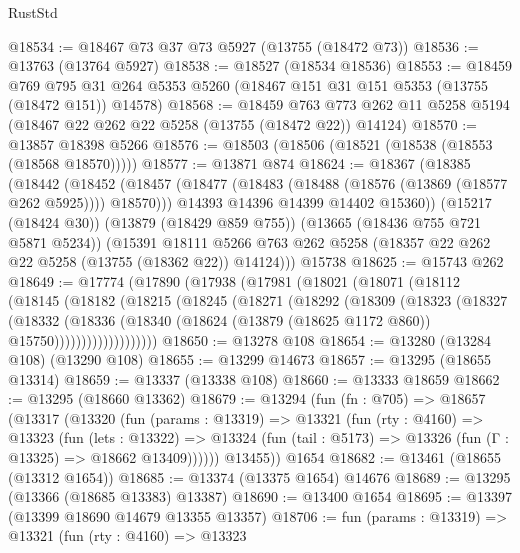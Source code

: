 \begin{lexlean}{RustStd}
\begin{coremodule}
@18534 := @18467 @73 @37 @73 @5927 (@13755 (@18472 @73))
@18536 := @13763 (@13764 @5927)
@18538 := @18527 (@18534 @18536)
@18553 := @18459
    @769
    @795
    @31
    @264
    @5353
    @5260
    (@18467 @151 @31 @151 @5353 (@13755 (@18472 @151)) @14578)
@18568 := @18459
    @763
    @773
    @262
    @11
    @5258
    @5194
    (@18467 @22 @262 @22 @5258 (@13755 (@18472 @22)) @14124)
@18570 := @13857 @18398 @5266
@18576 := @18503 (@18506 (@18521 (@18538 (@18553 (@18568 @18570)))))
@18577 := @13871 @874
@18624 := @18367
    (@18385
      (@18442
        (@18452
          (@18457 (@18477 (@18483 (@18488 (@18576 (@13869 (@18577 @262 @5925)))) @18570)))
          @14393
          @14396
          @14399
          @14402
          @15360))
      (@15217 (@18424 @30))
      (@13879 (@18429 @859 @755))
      (@13665 (@18436 @755 @721 @5871 @5234))
      (@15391
        @18111
        @5266
        @763
        @262
        @5258
        (@18357 @22 @262 @22 @5258 (@13755 (@18362 @22)) @14124)))
    @15738
@18625 := @15743 @262
@18649 := @17774
    (@17890
      (@17938
        (@17981
          (@18021
            (@18071
              (@18112
                (@18145
                  (@18182
                    (@18215
                      (@18245
                        (@18271
                          (@18292
                            (@18309
                              (@18323
                                (@18327
                                  (@18332
                                    (@18336
                                      (@18340
                                        (@18624
                                          (@13879 (@18625 @1172 @860))
                                          @15750)))))))))))))))))))
@18650 := @13278 @108
@18654 := @13280 (@13284 @108) (@13290 @108)
@18655 := @13299 @14673
@18657 := @13295 (@18655 @13314)
@18659 := @13337 (@13338 @108)
@18660 := @13333 @18659
@18662 := @13295 (@18660 @13362)
@18679 := @13294
    (fun (fn : @705) =>
    @18657
      (@13317
        (@13320
          (fun (params : @13319) =>
          @13321
            (fun (rty : @4160) =>
            @13323
              (fun (lets : @13322) =>
              @13324 (fun (tail : @5173) => @13326 (fun (Γ : @13325) => @18662 @13409))))))
        @13455))
    @1654
@18682 := @13461 (@18655 (@13312 @1654))
@18685 := @13374 (@13375 @1654) @14676
@18689 := @13295 (@13366 (@18685 @13383) @13387)
@18690 := @13400 @1654
@18695 := @13397 (@13399 @18690 @14679 @13355 @13357)
@18706 := fun (params : @13319) =>
  @13321
    (fun (rty : @4160) =>
    @13323

\end{coremodule}
\end{lexlean}
